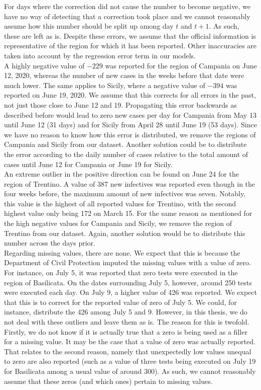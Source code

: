 \documentclass[12pt]{article}
\begin{document}
	For days where the correction did not cause the number to become negative, we have no way of detecting that a correction took place and we cannot reasonably assume how this number should be split up among day $t$ and $t+1$. As such, these are left as is. Despite these errors, we assume that the official information is representative of the region for which it has been reported. Other inaccuracies are taken into account by the regression error term in our models. \\
	
	A highly negative value of $-229$ was reported for the region of Campania on June 12, 2020, whereas the number of new cases in the weeks before that date were much lower. The same applies to Sicily, where a negative value of $-394$ was reported on June 19, 2020. We assume that this corrects for all errors in the past, not just those close to June 12 and 19. Propagating this error backwards as described before would lead to zero new cases per day for Campania from May 13 until June 12 (31 days) and for Sicily from April 28 until June 19 (53 days). Since we have no reason to know how this error is distributed, we remove the regions of Campania and Sicily from our dataset. Another solution could be to distribute the error according to the daily number of cases relative to the total amount of cases until June 12 for Campania or June 19 for Sicily. \\
	
	An extreme outlier in the positive direction can be found on June 24 for the region of Trentino. A value of 387 new infectives was reported even though in the four weeks before, the maximum amount of new infectives was seven. Notably, this value is the highest of all reported values for Trentino, with the second highest value only being 172 on March 15. For the same reason as mentioned for the high negative values for Campania and Sicily, we remove the region of Trentino from our dataset. Again, another solution would be to distribute this number across the days prior. \\
	
	Regarding missing values, there are none. We expect that this is because the Department of Civil Protection imputed the missing values with a value of zero. For instance, on July 5, it was reported that zero tests were executed in the region of Basilicata. On the dates surrounding July 5, however, around 250 tests were executed each day. On July 9, a higher value of 426 was reported. We expect that this is to correct for the reported value of zero of July 5. We could, for instance, distribute the 426 among July 5 and 9. However, in this thesis, we do not deal with these outliers and leave them as is. The reason for this is twofold. Firstly, we do not know if it is actually true that a zero is being used as a filler for a missing value. It may be the case that a value of zero was actually reported. That relates to the second reason, namely that unexpectedly low values unequal to zero are also reported (such as a value of three tests being executed on July 19 for Basilicata among a usual value of around 300). As such, we cannot reasonably assume that these zeros (and which ones) pertain to missing values.
	
\end{document}
